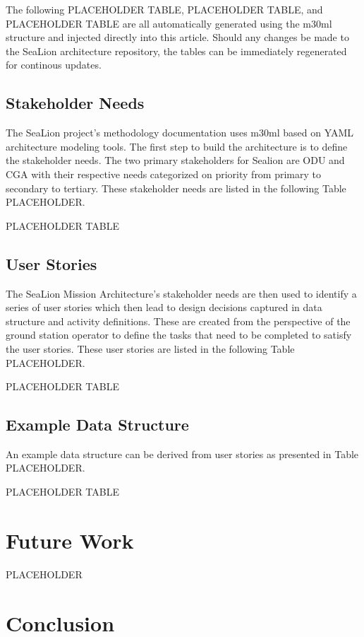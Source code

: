 \documentclass[conf]{new-aiaa}
\begin{document}
The following PLACEHOLDER TABLE, PLACEHOLDER TABLE, and PLACEHOLDER TABLE are all automatically generated using the m30ml structure and injected directly into this article. Should any changes be made to the SeaLion architecture repository, the tables can be immediately regenerated for continous updates.

\subsection{Stakeholder Needs}

The SeaLion project's methodology documentation uses m30ml based on YAML architecture modeling tools. The first step to build the architecture is to define the stakeholder needs. The two primary stakeholders for Sealion are ODU and CGA with their respective needs categorized on priority from primary to secondary to tertiary. These stakeholder needs are listed in the following Table PLACEHOLDER.

PLACEHOLDER TABLE

\subsection{User Stories}

The SeaLion Mission Architecture's stakeholder needs are then used to identify a series of user stories which then lead to design decisions captured in data structure and activity definitions. These are created from the perspective of the ground station operator to define the tasks that need to be completed to satisfy the user stories. These user stories are listed in the following Table PLACEHOLDER.

PLACEHOLDER TABLE

\subsection{Example Data Structure}

An example data structure can be derived from user stories as presented in Table PLACEHOLDER.

PLACEHOLDER TABLE

\section{Future Work}

PLACEHOLDER

\section{Conclusion}
\end{document}
